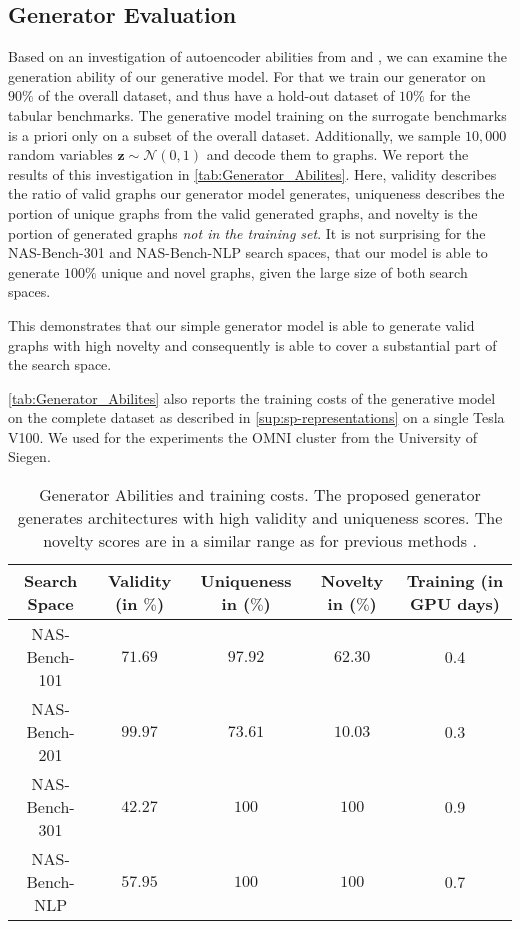 \documentclass[runningheads]{llncs}
\begin{document}
\subsection{Generator Evaluation}
Based on an investigation of autoencoder abilities from \cite{2020Arch2vec} and \cite{2021SVGe}, we can examine the generation ability of our generative model.
For that we train our generator on $90\%$ of the overall dataset, and thus have a hold-out dataset of $10\%$ for the tabular benchmarks. The generative model training on the surrogate benchmarks is a priori only on a subset of the overall dataset.
Additionally, we sample $10,000$ random variables $\textbf{z}\sim \mathcal{N}(0,1)$ and decode them to graphs.
We report the results of this investigation in \autoref{tab:Generator_Abilites}.
Here, validity describes the ratio of valid graphs our generator model generates,
uniqueness describes the portion of unique graphs from the valid generated graphs, and novelty is the portion of generated graphs \emph{not in the training set}. It is not surprising for the NAS-Bench-301 and NAS-Bench-NLP search spaces, that our model is able to generate $100 \%$ unique and novel graphs, given the large size of both search spaces.

This demonstrates that our simple generator model is able to generate valid graphs with high novelty and consequently is able to cover a substantial part of the search space.

\autoref{tab:Generator_Abilites} also reports the training costs of the generative model on the complete dataset as described in \autoref{sup:sp-representations} on a single Tesla V100.
We used for the experiments the OMNI cluster from the University of Siegen. 

\begin{table}[t]
	\caption{Generator Abilities and training costs. The proposed generator generates architectures with high validity and uniqueness scores. The novelty scores are in a similar range as for previous methods \cite{2021SVGe}.
		\label{tab:Generator_Abilites}}
	\scriptsize
	\begin{center}
		\begin{tabular}{c|c|c|c|c }
			\toprule
			Search Space  & Validity (in $\%$) & Uniqueness in ($\%$) & Novelty in ($\%$) &  Training (in GPU days)\\
			\midrule
			NAS-Bench-101 & $71.69$ & $97.92$ & $62.30$  & 0.4 \\
			NAS-Bench-201 & $99.97$ & $73.61$  & $10.03$ & 0.3\\
			NAS-Bench-301 & $42.27$  & $100$  &  $100$  & 0.9\\
			NAS-Bench-NLP & $57.95$ & $100$  & $100$  & 0.7 \\
			\bottomrule
		\end{tabular}
	\end{center}
\end{table}
\end{document}
